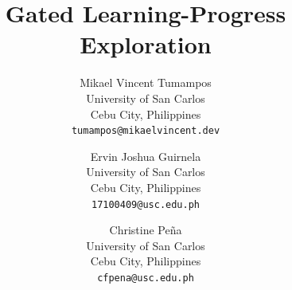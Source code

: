 \documentclass{article}
\title{Gated Learning-Progress Exploration}
\author{Mikael Vincent Tumampos\\
University of San Carlos\\
Cebu City, Philippines\\
\texttt{tumampos@mikaelvincent.dev}
\and
Ervin Joshua Guirnela\\
University of San Carlos\\
Cebu City, Philippines\\
\texttt{17100409@usc.edu.ph}
\and
Christine Pe\~na\\
University of San Carlos\\
Cebu City, Philippines\\
\texttt{cfpena@usc.edu.ph}
}
\begin{document}
\maketitle



\FloatBarrier



\end{document}
